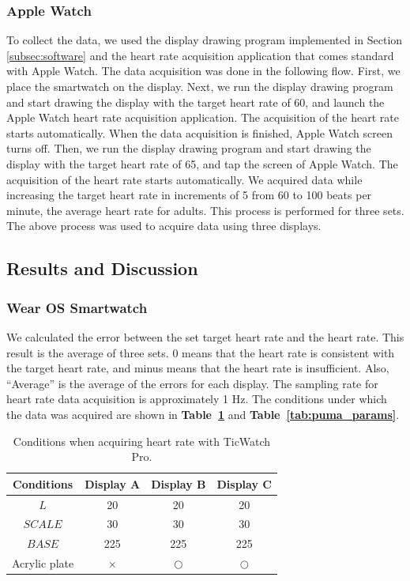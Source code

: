 \documentclass[sigchi,authordraft]{acmart}
\newcommand\tabref[1]{\textbf{Table~\ref{tab:#1}}}
\begin{document}
\subsubsection{Apple Watch}
To collect the data, we used the display drawing program implemented in Section \ref{subsec:software} and the heart rate acquisition application that comes standard with Apple Watch. The data acquisition was done in the following flow. First, we place the smartwatch on the display. Next, we run the display drawing program and start drawing the display with the target heart rate of 60, and launch the Apple Watch heart rate acquisition application. The acquisition of the heart rate starts automatically. When the data acquisition is finished, Apple Watch screen turns off. Then, we run the display drawing program and start drawing the display with the target heart rate of 65, and tap the screen of Apple Watch. The acquisition of the heart rate starts automatically. We acquired data while increasing the target heart rate in increments of 5 from 60 to 100 beats per minute, the average heart rate for adults\cite{average_heart_rate}. This process is performed for three sets. The above process was used to acquire data using three displays.


\subsection{Results and Discussion}

\subsubsection{Wear OS Smartwatch}
We calculated the error between the set target heart rate and the heart rate. This result is the average of three sets. 0 means that the heart rate is consistent with the target heart rate, and minus means that the heart rate is insufficient. Also, ``Average'' is the average of the errors for each display. The sampling rate for heart rate data acquisition is approximately 1 Hz. The conditions under which the data was acquired are shown in \tabref{ticwatch_params} and \tabref{puma_params}.\par

\begin{table}[!t]
  \centering
  \caption{Conditions when acquiring heart rate with TicWatch Pro.}
  \begin{tabular}{c|c|c|c} \hline\hline
    Conditions & Display A & Display B & Display C \\ \hline
    $L$ & 20 & 20 & 20 \\
    $SCALE$ & 30 & 30 & 30 \\
    $BASE$ & 225 & 225 & 225 \\
    Acrylic plate & $\times$ & $\bigcirc$ & $\bigcirc$ \\ \hline
  \end{tabular}
  \label{tab:ticwatch_params}
\end{table}
\end{document}
